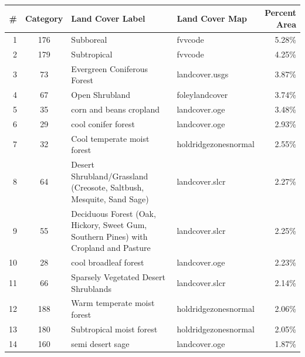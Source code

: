 \begin{frame}
 \frametitle{}\tiny
 \setlength{\tabcolsep}{0.5em}
 \begin{tabular}{r c p{1.8in} l r}
  \textbf{\#}  & \textbf{Category}  & \textbf{Land Cover Label} & \textbf{Land Cover Map} & \textbf{Percent Area} \\
  \hline
1 & 176 & Subboreal & fvvcode & 5.28\% \\
2 & 179 & Subtropical & fvvcode & 4.25\% \\
3 & 73 & Evergreen Coniferous Forest & landcover.usgs & 3.87\% \\
4 & 67 & Open Shrubland & foleylandcover & 3.74\% \\
5 & 35 & corn and beans cropland & landcover.oge & 3.48\% \\
6 & 29 & cool conifer forest & landcover.oge & 2.93\% \\
7 & 32 & Cool temperate moist forest & holdridgezonesnormal & 2.55\% \\
8 & 64 & Desert Shrubland/Grassland (Creosote, Saltbush, Mesquite, Sand Sage) & landcover.slcr & 2.27\% \\
9 & 55 & Deciduous Forest (Oak, Hickory, Sweet Gum, Southern Pines) with Cropland and Pasture & landcover.slcr & 2.25\% \\
10 & 28 & cool broadleaf forest & landcover.oge & 2.23\% \\
11 & 66 & Sparsely Vegetated Desert Shrublands & landcover.slcr & 2.14\% \\
12 & 188 & Warm temperate moist forest & holdridgezonesnormal & 2.06\% \\
13 & 180 & Subtropical moist forest & holdridgezonesnormal & 2.05\% \\
14 & 160 & semi desert sage & landcover.oge & 1.87\% \\

\end{tabular}
\end{frame}
